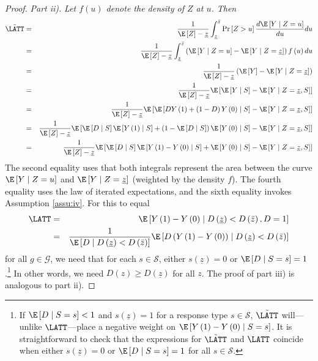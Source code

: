 \begin{proof}
\emph{Part ii).} \emph{Let $f\left(u\right)$ denote the density of
$Z$ at $u$. Then}
\begin{eqnarray*}
\tilde{\LATT} & = & \frac{1}{\E\left[Z\right]-\underline{z}}\int_{\underline{z}}^{\bar{z}}\Pr\left[Z>u\right]\frac{d\E\left[Y\mid Z=u\right]}{du}du\\
 & = & \frac{1}{\E\left[Z\right]-\underline{z}}\int_{\underline{z}}^{\bar{z}}\left(\E\left[Y\mid Z=u\right]-\E\left[Y\mid Z=\underline{z}\right]\right)f\left(u\right)du\\
 & = & \frac{1}{\E\left[Z\right]-\underline{z}}\left(\E\left[Y\right]-\E\left[Y\mid Z=\underline{z}\right]\right)\\
 & = & \frac{1}{\E\left[Z\right]-\underline{z}}\E\left[\E\left[Y\mid S\right]-\E\left[Y\mid Z=\underline{z},S\right]\right]\\
 & = & \frac{1}{\E\left[Z\right]-\underline{z}}\E\left[\E\left[DY\left(1\right)+\left(1-D\right)Y\left(0\right)\mid S\right]-\E\left[Y\mid Z=\underline{z},S\right]\right]\\
 & = & \frac{1}{\E\left[Z\right]-\underline{z}}\E\left[\E\left[D\mid S\right]\E\left[Y\left(1\right)\mid S\right]+\left(1-\E\left[D\mid S\right]\right)\E\left[Y\left(0\right)\mid S\right]-\E\left[Y\mid Z=\underline{z},S\right]\right]\\
 & = & \frac{1}{\E\left[Z\right]-\underline{z}}\E\left[\E\left[D\mid S\right]\E\left[Y\left(1\right)-Y\left(0\right)\mid S\right]+\E\left[Y\left(0\right)\mid S\right]-\E\left[Y\mid Z=\underline{z},S\right]\right]
\end{eqnarray*}
The second equality uses that both integrals represent the area between
the curve $\E\left[Y\mid Z=u\right]$ and $\E\left[Y\mid Z=\underline{z}\right]$
(weighted by the density $f$). The fourth equality uses the law of
iterated expectations, and the sixth equality invokes Assumption \ref{assu:iv}.
For this to equal 
\begin{eqnarray*}
\LATT & = & \E\left[Y\left(1\right)-Y\left(0\right)\mid D\left(\underline{z}\right)<D\left(\bar{z}\right),D=1\right]\\
 & = & \frac{1}{\E\left[D\mid D\left(\underline{z}\right)<D\left(\bar{z}\right)\right]}\E\left[D\left(Y\left(1\right)-Y\left(0\right)\right)\mid D\left(\underline{z}\right)<D\left(\bar{z}\right)\right]
\end{eqnarray*}
 for all $g\in\mathcal{G}$, we need that for each $s\in\mathcal{S}$,
either $s\left(\underline{z}\right)=0$ or $\E\left[D\mid S=s\right]=1$.\footnote{If $\E\left[D\mid S=s\right]<1$ and $s\left(\underline{z}\right)=1$
for a response type $s\in\mathcal{S}$, $\tilde{\LATT}$ will---unlike
$\LATT$---place a negative weight on $\E\left[Y\left(1\right)-Y\left(0\right)\mid S=s\right]$.
It is straightforward to check that the expressions for $\tilde{\LATT}$
and $\LATT$ coincide when either $s\left(\underline{z}\right)=0$
or $\E\left[D\mid S=s\right]=1$ for all $s\in\mathcal{S}$.} In other words, we need $D\left(z\right)\geq D\left(\underline{z}\right)$
for all $z$. The proof of part iii) is analogous to part ii).
\end{proof}
